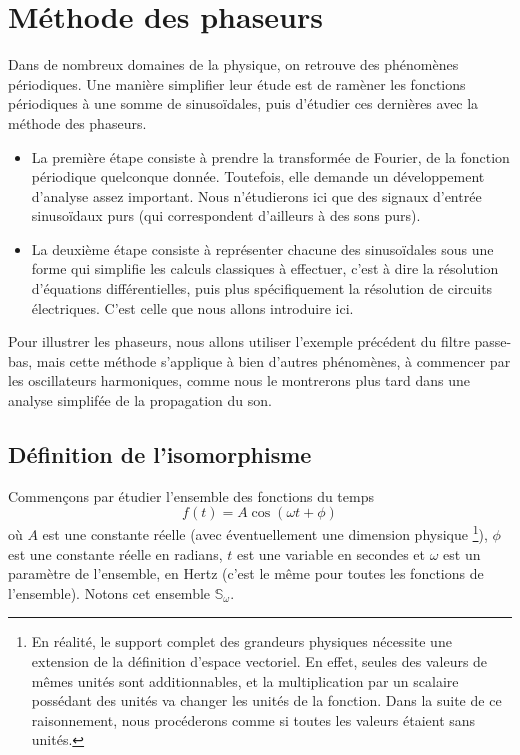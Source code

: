 \section{Méthode des phaseurs}

Dans de nombreux domaines de la physique,
on retrouve des phénomènes périodiques.
Une manière simplifier leur étude
est de ramèner les fonctions périodiques à une somme de sinusoïdales,
puis d'étudier ces dernières avec la méthode des phaseurs.
\begin{itemize}
    \item La première étape consiste à prendre la transformée de Fourier,
        de la fonction périodique quelconque donnée.
        Toutefois, elle demande un développement d'analyse assez important.
        Nous n'étudierons ici que des signaux d'entrée sinusoïdaux purs
        (qui correspondent d'ailleurs à des sons purs).
    \item La deuxième étape consiste à représenter chacune des sinusoïdales
        sous une forme qui simplifie les calculs classiques à effectuer,
        c'est à dire la résolution d'équations différentielles,
        puis plus spécifiquement la résolution de circuits électriques.
        C'est celle que nous allons introduire ici.
\end{itemize}

Pour illustrer les phaseurs, nous allons utiliser l'exemple précédent
du filtre passe-bas,
mais cette méthode s'applique à bien d'autres phénomènes,
à commencer par les oscillateurs harmoniques,
comme nous le montrerons plus tard dans
une analyse simplifée de la propagation du son.

\subsection{Définition de l'isomorphisme}
Commençons par étudier l'ensemble des fonctions du temps
\[
    f(t) = A\cos(\omega t + \phi)
\]
où $A$ est une constante réelle (avec éventuellement une dimension physique
\footnote{
    En réalité, le support complet des grandeurs physiques
    nécessite une extension de la définition d'espace vectoriel.
    En effet, seules des valeurs de mêmes unités sont additionnables,
    et la multiplication par un scalaire possédant des unités
    va changer les unités de la fonction.
    Dans la suite de ce raisonnement,
    nous procéderons comme si toutes les valeurs étaient sans unités.
}),
$\phi$ est une constante réelle en radians,
$t$ est une variable en secondes
et $\omega$ est un paramètre de l'ensemble, en Hertz
(c'est le même pour toutes les fonctions de l'ensemble).
Notons cet ensemble $\mathbb{S}_\omega$.

